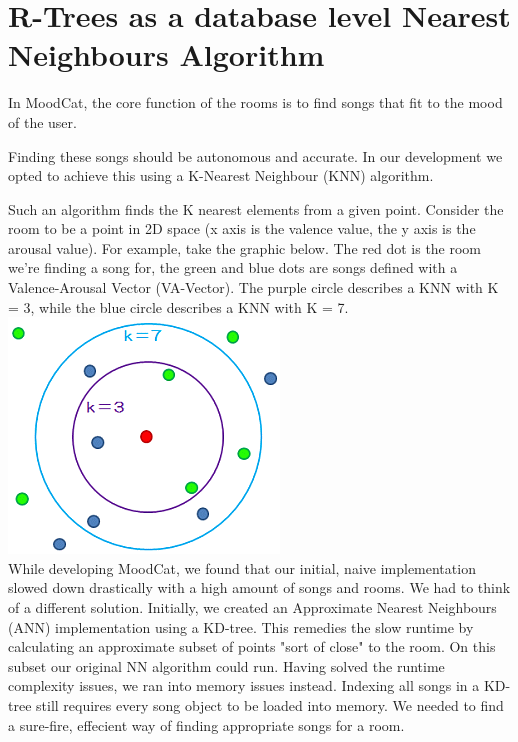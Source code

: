 \chapter{R-Trees as a database level Nearest Neighbours Algorithm}

In MoodCat, the core function of the rooms is to find songs that fit to the mood of the user.

Finding these songs should be autonomous and accurate. 
In our development we opted to achieve this using a K-Nearest Neighbour (KNN) algorithm.

Such an algorithm finds the K nearest elements from a given point. 
Consider the room to be a point in 2D space (x axis is the valence value, the y axis is the arousal value). 
For example, take the graphic below. 
The red dot is the room we're finding a song for, the green and blue dots are songs defined with a Valence-Arousal Vector (VA-Vector). 
The purple circle describes a KNN with K = 3, while the blue circle describes a KNN with K = 7. \\
\includegraphics[scale=0.6]{knearestneighboursexample.png}\\

While developing MoodCat, we found that our initial, naive implementation slowed down drastically with a high amount of songs and rooms. 
We had to think of a different solution. 
Initially, we created an Approximate Nearest Neighbours (ANN) implementation using a KD-tree.
This remedies the slow runtime by calculating an approximate subset of points "sort of close" to the room.
On this subset our original NN algorithm could run.
Having solved the runtime complexity issues, we ran into memory issues instead.
Indexing all songs in a KD-tree still requires every song object to be loaded into memory.
We needed to find a sure-fire, effecient way of finding appropriate songs for a room.\\

